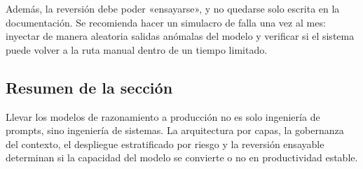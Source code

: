 Además, la reversión debe poder «ensayarse», y no quedarse solo escrita en la documentación. Se recomienda hacer un simulacro de falla una vez al mes: inyectar de manera aleatoria salidas anómalas del modelo y verificar si el sistema puede volver a la ruta manual dentro de un tiempo limitado.

\subsection{Resumen de la sección}

Llevar los modelos de razonamiento a producción no es solo ingeniería de prompts, sino ingeniería de sistemas. La arquitectura por capas, la gobernanza del contexto, el despliegue estratificado por riesgo y la reversión ensayable determinan si la capacidad del modelo se convierte o no en productividad estable.

